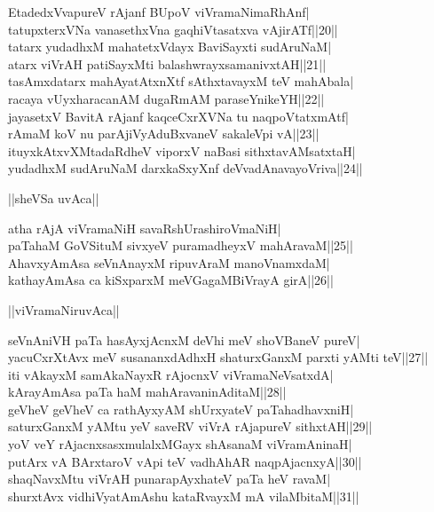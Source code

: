 \documentclass{article}
\begin{document}
EtadedxVvapureV rAjanf BUpoV viVramaNimaRhAnf|\\
tatupxterxVNa vanasethxVna gaqhiVtasatxva vAjirATf||20||\\
tatarx yudadhxM mahatetxVdayx BaviSayxti sudAruNaM|\\
atarx viVrAH patiSayxMti balashwrayxsamanivxtAH||21||\\
tasAmxdatarx mahAyatAtxnXtf sAthxtavayxM teV mahAbala|\\
racaya vUyxharacanAM dugaRmAM paraseYnikeYH||22||\\
jayasetxV BavitA rAjanf kaqceCxrXVNa tu naqpoVtatxmAtf|\\
rAmaM koV nu parAjiVyAduBxvaneV sakaleVpi vA||23||\\
ituyxkAtxvXMtadaRdheV viporxV naBasi sithxtavAMsatxtaH|\\
yudadhxM sudAruNaM darxkaSxyXnf deVvadAnavayoVriva||24||\\

\begin{center}
||sheVSa uvAca||
\end{center}

atha rAjA viVramaNiH savaRshUrashiroVmaNiH|\\
paTa{ha}M GoVSituM sivxyeV puramadheyxV mahAravaM||25||\\
AhavxyAmAsa seVnAnayxM ripuvAraM manoVnamxdaM|\\
kathayAmAsa ca kiSxparxM meVGagaMBiVrayA girA||26||\\

\begin{center}
||viVramaNiruvAca||
\end{center}

seVnAniVH paTa hasAyxjAcnxM deVhi meV shoVBaneV pureV|\\
yacuCxrXtAvx meV susananxdAdhxH shaturxGanxM parxti yAMti teV||27||\\
iti vAkayxM samAkaNayxR rAjocnxV viVramaNeVsatxdA|\\
kArayAmAsa paTa haM mahAravaninAditaM||28||\\
geVheV geVheV ca rathAyxyAM shUrxyateV {pa{Ta}hadhavxniH|}\\ 
saturxGanxM yAMtu yeV saveRV viVrA rAjapureV sithxtAH||29||\\
yoV veY rAjacnxsasxmulalxMGayx shAsanaM viVramAninaH|\\
putArx vA BArxtaroV vApi teV vadhAhAR naqpAjacnxyA||30||\\
shaqNavxMtu viVrAH punarapAyxhateV paTa heV ravaM|\\
shurxtAvx vidhiVyatAmAshu kataRvayxM mA vilaMbitaM||31||
\end{document}
